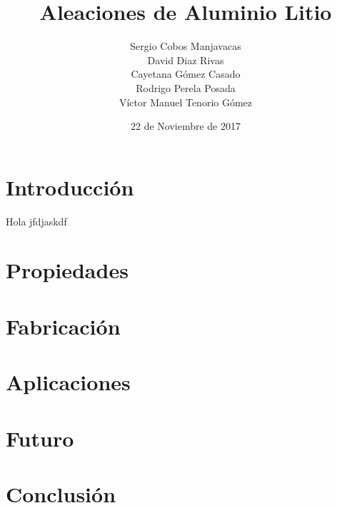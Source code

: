 \documentclass{article}
\author{Sergio Cobos Manjavacas \\
	David Diaz Rivas \\
	Cayetana G\'omez Casado \\
	Rodrigo Perela Posada \\
	V\'ictor Manuel Tenorio G\'omez
	}
\title{Aleaciones de Aluminio Litio}
\date{22 de Noviembre de 2017}
\begin{document}
	
	\maketitle
	\newpage
	\tableofcontents
	\newpage
	
	\section{Introducción}
	Hola jfdjaskdf
	\section{Propiedades}
	
	\section{Fabricación}
	
	\section{Aplicaciones}
	
	\section{Futuro}
	
	\section{Conclusión}
	
	
\end{document}
